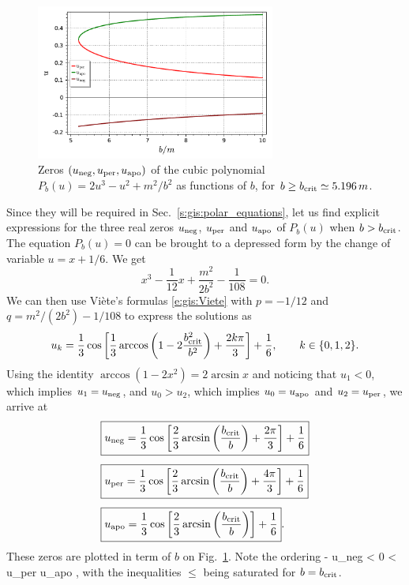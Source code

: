 \begin{figure}
\centerline{\includegraphics[width=0.7\textwidth]{gis_u_per_apo_neg.pdf}}
\caption[]{\label{f:gis:u_per_apo_neg} \footnotesize
Zeros $(u_{\rm neg}, u_{\rm per}, u_{\rm apo})$ of the cubic polynomial
$P_b(u) =  2 u^3 - u^2 + {m^2}/{b^2}$ as functions of $b$, for
$b\geq b_{\rm crit} \simeq 5.196\, m$.}
\end{figure}

Since they will be required in Sec.~\ref{s:gis:polar_equations}, let us
find explicit expressions for the three real zeros $u_{\rm neg}$,
$u_{\rm per}$ and $u_{\rm apo}$ of $P_b(u)$ when $b > b_{\rm crit}$. The
equation $P_b(u) = 0$ can be brought to a depressed form by the change
of variable $u = x + 1/6$. We get
\[
    x^3 - \frac{1}{12} x + \frac{m^2}{2b^2} - \frac{1}{108} = 0 .
\]
We can then use Viète's formulas \eqref{e:gis:Viete}
with $p = -1/12$ and $q = m^2/(2b^2) - 1/108$ to express the solutions
as
\[
    u_k = \frac{1}{3} \cos \left[ \frac{1}{3}
        \arccos \left( 1 - 2 \frac{b_{\rm crit}^2}{b^2} \right) + \frac{2 k \pi}{3} \right]
        + \frac{1}{6},
        \qquad k \in \{0, 1, 2\} .
\]
Using the identity $\arccos(1 - 2 x^2) = 2\arcsin x$ and noticing
that $u_1 < 0$, which implies $u_1 = u_{\rm neg}$, and $u_ 0 > u_2$, which
implies $u_0 = u_{\rm apo}$ and $u_2 = u_{\rm per}$,
we arrive at
\begin{subequations}
\label{e:gis:zeros_Pbu}
\begin{align}
  &  \fbox{$\displaystyle u_{\rm neg} = \frac{1}{3}\cos\left[ \frac{2}{3} \arcsin\left(
   \frac{b_{\rm crit}}{b}\right) + \frac{2\pi}{3}\right] + \frac{1}{6} $}\\[1ex]
 & \fbox{$\displaystyle  u_{\rm per} = \frac{1}{3}\cos\left[ \frac{2}{3} \arcsin\left(
   \frac{b_{\rm crit}}{b}\right) + \frac{4\pi}{3}\right] + \frac{1}{6} $}
                            \label{e:gis:u_per_b}\\[1ex]
 & \fbox{$\displaystyle  u_{\rm apo} = \frac{1}{3}\cos\left[ \frac{2}{3} \arcsin\left(
   \frac{b_{\rm crit}}{b}\right) \right] + \frac{1}{6} $} .
\end{align}
\end{subequations}
These zeros are plotted in term of $b$ on Fig.~\ref{f:gis:u_per_apo_neg}.
Note the ordering
\be
    - \leq u_{\rm neg} < 0 < u_{\rm per} \leq {}
    \leq u_{\rm apo} ,
\ee
with the inequalities $\leq$ being saturated for $b = b_{\rm crit}$.

